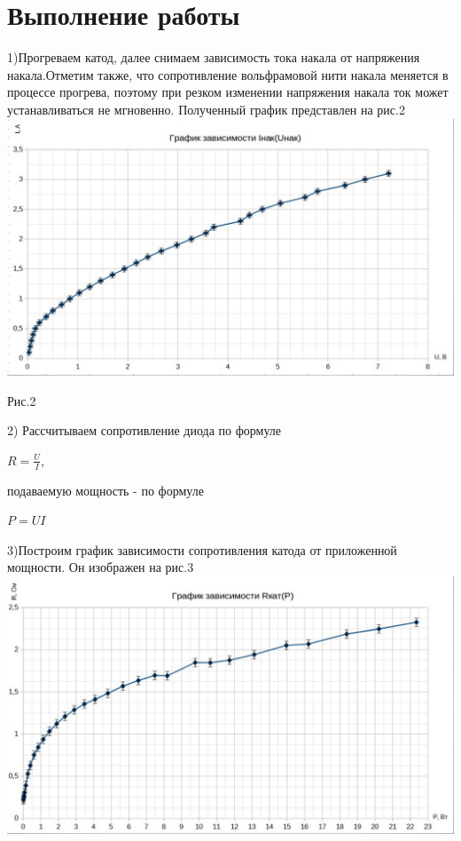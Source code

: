 \documentclass[11pt]{article}
\begin{document}
\section{Выполнение работы}
 1)Прогреваем катод, далее снимаем зависимость тока накала от напряжения накала.Отметим также, что сопротивление вольфрамовой нити накала меняется в процессе прогрева, поэтому при резком изменении напряжения накала ток может устанавливаться не мгновенно. Полученный график представлен на рис.2\\
\includegraphics[width=19cm]{g1}\\
\begin{center}
Рис.2\\
\end{center}
2) Рассчитываем сопротивление диода по формуле 
\begin{center}
    $R = \frac{U}{I}$,
\end{center}
подаваемую мощность - по формуле
\begin{center}
    $P = U I$
\end{center}
3)Построим график зависимости сопротивления катода от приложенной мощности. Он изображен на рис.3\\
\includegraphics[width=19cm]{g2}\\
\end{document}
